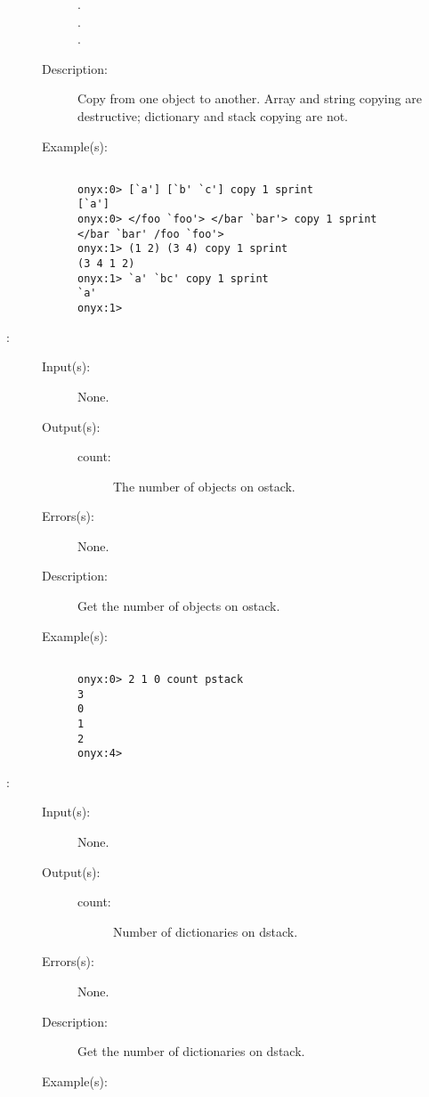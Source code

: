 \begin{description}
\begin{description}
\begin{description}
		\item[.]
		\item[.]
		\item[.]
		\end{description}
	\item[Description: ]
		Copy from one object to another.  Array and string copying are
		destructive; dictionary and stack copying are not.
	\item[Example(s): ]\begin{verbatim}

onyx:0> [`a'] [`b' `c'] copy 1 sprint
[`a']
onyx:0> </foo `foo'> </bar `bar'> copy 1 sprint
</bar `bar' /foo `foo'>
onyx:1> (1 2) (3 4) copy 1 sprint
(3 4 1 2)
onyx:1> `a' `bc' copy 1 sprint
`a'
onyx:1>
		\end{verbatim}
	\end{description}
\label{systemdict:count}
\item[{\onyxop{--}{count}{count}}: ]
	\begin{description}\item[]
	\item[Input(s): ] None.
	\item[Output(s): ]
		\begin{description}\item[]
		\item[count: ]
			The number of objects on ostack.
		\end{description}
	\item[Errors(s): ] None.
	\item[Description: ]
		Get the number of objects on ostack.
	\item[Example(s): ]\begin{verbatim}

onyx:0> 2 1 0 count pstack
3
0
1
2
onyx:4>
		\end{verbatim}
	\end{description}
\label{systemdict:countdstack}
\item[{\onyxop{--}{countdstack}{count}}: ]
	\begin{description}\item[]
	\item[Input(s): ] None.
	\item[Output(s): ]
		\begin{description}\item[]
		\item[count: ]
			Number of dictionaries on dstack.
		\end{description}
	\item[Errors(s): ] None.
	\item[Description: ]
		Get the number of dictionaries on dstack.
	\item[Example(s): ]\begin{verbatim}


\end{verbatim}
\end{description}
\end{description}
